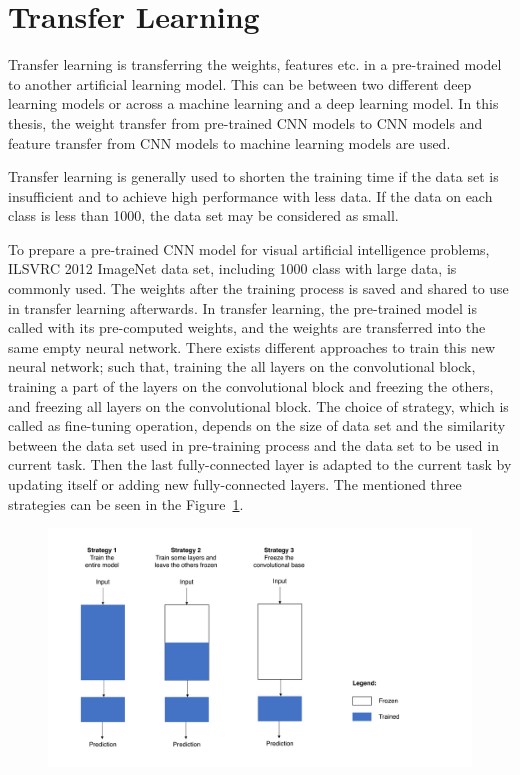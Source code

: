 \section{Transfer Learning} \label{CH3:transfer_learning}

Transfer learning is transferring the weights, features etc. in a pre-trained model to another artificial learning model. This can be between two different deep learning models or across a machine learning and a deep learning model. In this thesis, the weight transfer from pre-trained CNN models to CNN models and feature transfer from CNN models to machine learning models are used.

Transfer learning is generally used to shorten the training time if the data set is insufficient and to achieve high performance with less data. If the data on each class is less than 1000, the data set may be considered as small. 

To prepare a pre-trained CNN model for visual artificial intelligence problems, ILSVRC 2012 ImageNet \cite{imagenet} data set, including 1000 class with large data, is commonly used. The weights after the training process is saved and shared to use in transfer learning afterwards. In transfer learning, the pre-trained model is called with its pre-computed weights, and the weights are transferred into the same empty neural network. There exists different approaches to train this new neural network; such that, training the all layers on the convolutional block, training a part of the layers on the convolutional block and freezing the others, and freezing all layers on the convolutional block. The choice of strategy, which is called as fine-tuning operation, depends on the size of data set and the similarity between the data set used in pre-training process and the data set to be used in current task. Then the last fully-connected layer is adapted to the current task by updating itself or adding new fully-connected layers. The mentioned three strategies can be seen in the Figure~\ref{fig:pretrain_strategies}.

\begin{figure}[h]
    \centering
    \includegraphics[width=.8\linewidth]{fig/pretrain_strategies.png}
	\vspace*{1mm}
    \label{fig:pretrain_strategies}
\end{figure}

